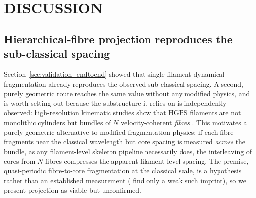 \documentclass[usenatbib,twoside,twocolumn]{mnras}
\begin{document}
\section{DISCUSSION}
\label{sec:discussion}

\subsection{Hierarchical-fibre projection reproduces the sub-classical spacing}
\label{sec:fibre_projection}

Section~\ref{sec:validation_endtoend} showed that single-filament dynamical fragmentation already reproduces the observed sub-classical spacing. A second, purely geometric route reaches the same value without any modified physics, and is worth setting out because the substructure it relies on is independently observed: high-resolution kinematic studies show that HGBS filaments are not monolithic cylinders but bundles of $N$ velocity-coherent \emph{fibres} \citep{Hacar2013,Hacar2018,Yang2024}. This motivates a purely geometric alternative to modified fragmentation physics: if each fibre fragments near the classical wavelength but core spacing is measured \emph{across} the bundle, as any filament-level skeleton pipeline necessarily does, the interleaving of cores from $N$ fibres compresses the apparent filament-level spacing. The premise, quasi-periodic fibre-to-core fragmentation at the classical scale, is a hypothesis rather than an established measurement (\citealt{Yang2024} find only a weak such imprint), so we present projection as viable but unconfirmed.
\end{document}
